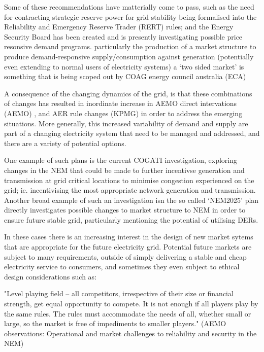 Some of these recommendations have matterially come to pass, such as the need for contracting strategic reserve power for grid stability being formalised into the Reliability and Emergency Reserve Trader (RERT) rules; and the Energy Security Board has been created and is presently investigating possible price resonsive demand programs.
particularly the production of a market structure to produce demand-responsive supply/consumption against generation (potentially even extending to normal users of electricity systems) a `two sided market' is something that is being scoped out by COAG energy council australia (ECA) 


A consequence of the changing dynamics of the grid, is that these combinations of changes has resulted in inordinate increase in AEMO direct intervations (AEMO) , and AER rule changes (KPMG) in order to address the emerging situations.
More generally, this increased variability of demand and supply are part of a changing electricity system that need to be managed and addressed, and there are a variety of potential options.

One example of such plans is the current COGATI investigation, exploring changes in the NEM that could be made to further incentivse generation and transmission at grid critical locations to minimise congestion experienced on the grid; ie. incentivising the most appropriate network generation and transmission.
Another broad example of such an investigation isn the so called `NEM2025' plan directly investigates possible changes to market structure to NEM in order to ensure future stable grid, particularly mentioning the potential of utilising DERs.





In these cases there is an increasing interest in the design of new market sytems that are appropriate for the future electricity grid.
Potential future markets are subject to many requirements, outside of simply delivering a stable and cheap electricity service to consumers, and sometimes they even subject to ethical design considerations such as:

"Level playing field – all competitors, irrespective of their size or financial strength, get equal opportunity to
compete. It is not enough if all players play by the same rules. The rules must accommodate the needs of all,
whether small or large, so the market is free of impediments to smaller players." (AEMO observations: Operational and market challenges to reliability and security in the NEM)

